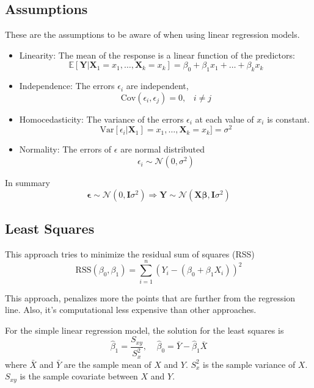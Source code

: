 \subsection{Assumptions}
These are the assumptions to be aware of when using linear regression models.
\begin{itemize}
    \item Linearity: The mean of the response is a linear function of the predictors:
    \[ \mathbb{E}[\bm{Y}|\bm{X}_1=x_1,\dots,\bm{X}_k=x_k] = \beta_0 + \beta_1 x_1 + \dots + \beta_k x_k \]
    \item Independence: The errors $\epsilon_i$ are independent,
    \[ \text{Cov}(\epsilon_i, \epsilon_j) = 0, \;\;\; i \neq j \] 
    \item Homocedasticity: The variance of the errors $\epsilon_i$ at each value of $x_i$ is constant.
    \[ \text{Var}[\epsilon_i | \bm{X}_1] = x_1,\dots, \bm{X}_k=x_k] = \sigma^2 \]
    \item Normality: The errors of $\epsilon$ are normal distributed
    \[ \epsilon_i \sim \mathcal{N}(0, \sigma^2) \]
\end{itemize}

\begin{tcolorbox}
    In summary
    \begin{equation*}
        \bm{\epsilon} \sim \mathcal{N}(0,\bm{I}\sigma^2) \Rightarrow \bm{Y}\sim \mathcal{N}(\bm{X\beta},\bm{I}\sigma^2) 
    \end{equation*}
\end{tcolorbox}

\subsection{Least Squares}
This approach tries to minimize the residual sum of squares (RSS)
\begin{equation*}
    \text{RSS}(\beta_0,\beta_1) = \sum_{i=1}^n (Y_i - (\beta_0 + \beta_1 X_i ))^2
\end{equation*}

This approach, penalizes more the points that are further from the regression
line. Also, it's computational less expensive than other approaches.

\begin{tcolorbox}
    For the simple linear regression model, the solution for the least squares is 
    \[ \hat{\beta}_1 = \frac{S_{xy}}{S_x^2}, \;\;\;\; \hat{\beta}_0 = \bar{Y}-\hat{\beta}_1 \bar{X} \] 
    where $\bar{X}$ and $\bar{Y}$ are the
    sample mean of $X$ and $Y$. $S_x^2$ is the sample variance of $X$. $S_{xy}$ is the sample covariate between $X$ and $Y$.
\end{tcolorbox}

